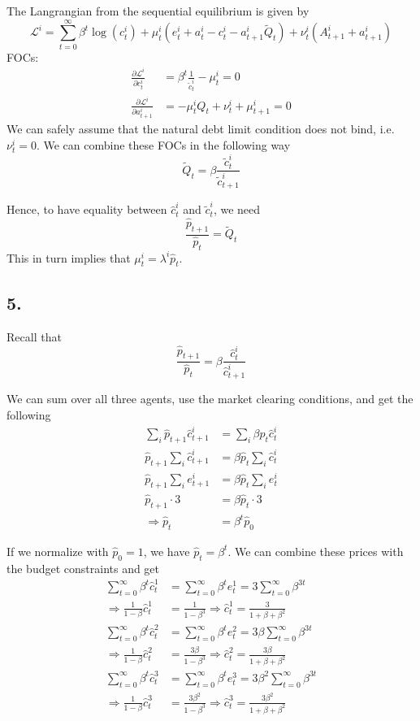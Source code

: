 \documentclass[12pt]{article}
\theoremstyle{definition}
\begin{document}
The Langrangian from the sequential equilibrium is given by
\[
\mathcal{L}^i = \sum_{t=0}^{\infty}\beta^t \log(c_t^i) + \mu_t^i (e_t^i + a_{t}^i- c_t^i-a_{t+1}^i \tilde{Q}_t ) + \nu_t^i ( A_{t+1}^i + a_{t+1}^i)
\]
FOCs:
\begin{align*}
\frac{\partial \mathcal{L}^i}{\partial c_t^i} & = \beta^t \frac{1}{\tilde{c}_t^i} - \mu_t^i  =0 \\
\frac{\partial \mathcal{L}^i}{\partial a_{t+1}^i} & = - \mu_t^i Q_{t} + \nu_t^i + \mu_{t+1}^i =0
\end{align*}
We can safely assume that the natural debt limit condition does not bind, i.e. $\nu_t^i =0$. We can combine these FOCs in the following way
\[
\boxed{\tilde{Q}_{t} = \beta \frac{\tilde{c}_t^i}{\tilde{c}_{t+1}^i}}
\]

Hence, to have equality between $\hat{c}_t^i$ and $\tilde{c}_t^i$, we need \[\frac{\hat{p}_{t+1}}{\hat{p}_t} =  \tilde{Q}_{t}\] This in turn implies that $\mu_t^i = \lambda^i \hat{p}_t$.


\subsection*{5.}

Recall that
\[
\frac{\hat{p}_{t+1}}{\hat{p}_t} = \beta \frac{\hat{c}_t^i}{\hat{c}_{t+1}^i}
\]

We can sum over all three agents, use the market clearing conditions, and get the following
\begin{align*}
	\sum_i \hat{p}_{t+1}\hat{c}_{t+1}^i & = \sum_i  \beta \hat{p}_t \hat{c}_t^i \\
	\hat{p}_{t+1} \sum_i \hat{c}_{t+1}^i & =  \beta \hat{p}_t \sum_i  \hat{c}_t^i\\
	\hat{p}_{t+1} \sum_i e_{t+1}^i & =  \beta \hat{p}_t \sum_i  e_t^i\\
	\hat{p}_{t+1} \cdot 3 & =  \beta \hat{p}_t \cdot 3\\
	\Rightarrow \hat{p}_{t}  & =  \beta^t \hat{p}_0
\end{align*}

If we normalize with $\hat{p}_0=1$, we have $ \hat{p}_{t}  =  \beta^t$. We can combine these prices with the budget constraints and get
\begin{align*}
	\sum_{t=0}^{\infty}\beta^t\hat{c}_t^1  & = \sum_{t=0}^{\infty}\beta^t e_t^1 = 3\sum_{t=0}^{\infty}\beta^{3t}\\
	\Rightarrow \frac{1}{1-\beta} \hat{c}_t^1 &  = \frac{1}{1-\beta^3} \Rightarrow \hat{c}_t^1 = \frac{3}{1+\beta +\beta^2}\\
	\sum_{t=0}^{\infty}\beta^t\hat{c}_t^2  & = \sum_{t=0}^{\infty}\beta^t e_t^2 = 3\beta \sum_{t=0}^{\infty}\beta^{3t}\\
	\Rightarrow \frac{1}{1-\beta} \hat{c}_t^2 &  = \frac{3\beta}{1-\beta^3} \Rightarrow \hat{c}_t^2 = \frac{3\beta}{1+\beta +\beta^2}\\
	\sum_{t=0}^{\infty}\beta^t\hat{c}_t^3  & = \sum_{t=0}^{\infty}\beta^t e_t^3 = 3\beta^2 \sum_{t=0}^{\infty}\beta^{3t}\\
	\Rightarrow \frac{1}{1-\beta} \hat{c}_t^3 &  = \frac{3\beta^2}{1-\beta^3} \Rightarrow \hat{c}_t^3 = \frac{3\beta^2}{1+\beta +\beta^2}
\end{align*}
\end{document}
